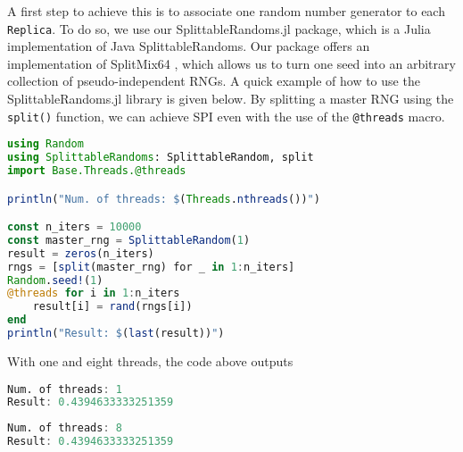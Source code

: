  
A first step to achieve this is to associate one random number 
generator to each \texttt{Replica}. 
To do so, we use our SplittableRandoms.jl package, which is a Julia implementation 
of Java SplittableRandoms. Our package offers an implementation of  
SplitMix64 \cite{steele2014fast},
which allows us to turn one seed into an arbitrary collection of pseudo-independent 
RNGs. 
A quick example of how to use the SplittableRandoms.jl library is given below. 
By splitting a master RNG using the \texttt{split()} function, 
we can achieve SPI even with the use of the \texttt{@threads} macro. 

\begin{lstlisting}[language = Julia]
using Random
using SplittableRandoms: SplittableRandom, split
import Base.Threads.@threads

println("Num. of threads: $(Threads.nthreads())")

const n_iters = 10000
const master_rng = SplittableRandom(1)
result = zeros(n_iters)
rngs = [split(master_rng) for _ in 1:n_iters]
Random.seed!(1)
@threads for i in 1:n_iters
    result[i] = rand(rngs[i])
end
println("Result: $(last(result))")
\end{lstlisting}
With one and eight threads, the code above outputs
\begin{lstlisting}[language = Julia]
Num. of threads: 1
Result: 0.4394633333251359
\end{lstlisting}
\begin{lstlisting}[language = Julia]
Num. of threads: 8
Result: 0.4394633333251359
\end{lstlisting}